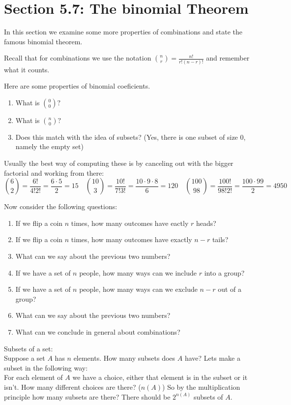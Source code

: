 \documentclass[14,fleqn]{article}
\begin{document}
\section{Section 5.7: The binomial Theorem}
In this section we examine some more properties of combinations and state the famous binomial theorem.

Recall that for combinations we use the notation $\binom{n}{r}=\frac{n!}{r!(n-r)!}$ and remember what it counts.

Here are some properties of binomial coeficients.
\begin{enumerate}
	\item What is $\binom{0}{0}?$
	\item What is $\binom{n}{0}?$
	\item Does this match with the idea of subsets? (Yes, there is one subset of size 0, namely the empty set)
\end{enumerate}

Usually the best way of computing these is by canceling out with the bigger factorial and working from there:
\[
	\binom{6}{2}=\frac{6!}{4!2!}=\frac{6\cdot 5}{2}=15 \quad \binom{10}{3}=\frac{10!}{7!3!}=\frac{10\cdot 9\cdot 8}{6}=120 \quad \binom{100}{98}=\frac{100!}{98!2!}=\frac{100\cdot 99}{2}=4950
\]

Now consider the following questions:
\begin{enumerate}
	\item If we flip a coin $n$ times, how many outcomes have eactly $r$ heads?
	\item If we flip a coin $n$ times, how many outcomes have exactly $n-r$ tails?
	\item What can we say about the previous two numbers?
	\item If we have a set of $n$ people, how many ways can we include $r$ into a group?
	\item If we have a set of $n$ people, how many ways can we exclude $n-r$ out of a group?
	\item What can we say about the previous two numbers?
	\item What can we conclude in general about combinations?
\end{enumerate}

Subsets of a set:\\
Suppose a set $A$ has $n$ elements. How many subsets does $A$ have? Lets make a subset in the following way:\\
For each element of $A$ we have a choice, either that element is in the subset or it isn't. How many different choices are there? ($n(A)$) So by the multiplication principle how many subsets are there? There should be $2^{n(A)}$ subsets of $A.$\\
\end{document}
